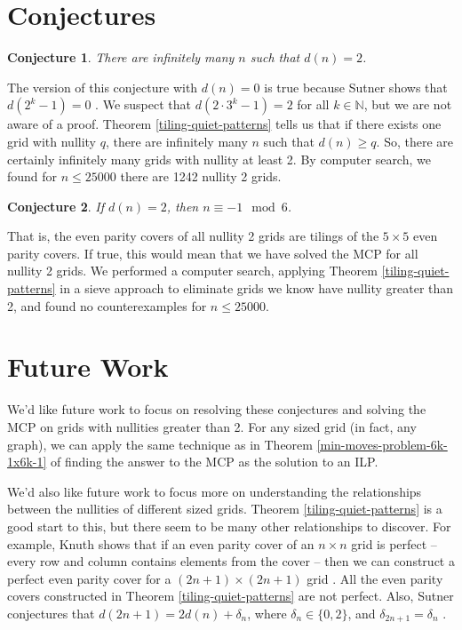 \documentclass[a4paper]{article}
\newtheorem{conjecture}{Conjecture}
\newcommand{\N}{\mathbb{N}}
\begin{document}
	\section{Conjectures}
	\begin{conjecture}\label{infinite-nullity-2}
		There are infinitely many $n$ such that $d(n) = 2$.
	\end{conjecture}
	The version of this conjecture with $d(n) = 0$ is true because Sutner shows that $d(2^k - 1) = 0$ \cite{Sutner1989}.
	We suspect that $d(2 \cdot 3^k - 1) = 2$ for all $k \in \N$, but we are not aware of a proof.
	Theorem \ref{tiling-quiet-patterns} tells us that if there exists one grid with nullity $q$, there are infinitely many $n$ such that $d(n) \geq q$.
	So, there are certainly infinitely many grids with nullity at least 2.
	By computer search, we found for $n \leq 25000$ there are 1242 nullity 2 grids.
	
	\begin{conjecture}\label{all-nullity2-conj}
		If $d(n) = 2$, then $n \equiv -1 \mod 6$.
	\end{conjecture}
	That is, the even parity covers of all nullity 2 grids are tilings of the $5 \times 5$ even parity covers.
	If true, this would mean that we have solved the MCP for all nullity 2 grids.
	We performed a computer search, applying Theorem \ref{tiling-quiet-patterns} in a sieve approach to eliminate grids we know have nullity greater than 2, and found no counterexamples for $n \leq 25000$.
	
	\section{Future Work}
	We'd like future work to focus on resolving these conjectures and solving the MCP on grids with nullities greater than 2.
	For any sized grid (in fact, any graph), we can apply the same technique as in Theorem \ref{min-moves-problem-6k-1x6k-1} of finding the answer to the MCP as the solution to an ILP.
	
	We'd also like future work to focus more on understanding the relationships between the nullities of different sized grids.
	Theorem \ref{tiling-quiet-patterns} is a good start to this, but there seem to be many other relationships to discover.
	For example, Knuth shows that if an even parity cover of an $n \times n$ grid is perfect -- every row and column contains elements from the cover -- then we can construct a perfect even parity cover for a $(2n+1) \times (2n+1)$ grid \cite{Knuth_AOCP4A}.
	All the even parity covers constructed in Theorem \ref{tiling-quiet-patterns} are not perfect.
	Also, Sutner conjectures that $d(2n+1) = 2d(n) + \delta_n$, where $\delta_n \in \{0,2\}$, and $\delta_{2n+1} = \delta_n$ \cite{Sutner1989}.
	
	\newpage
	
	
\end{document}
